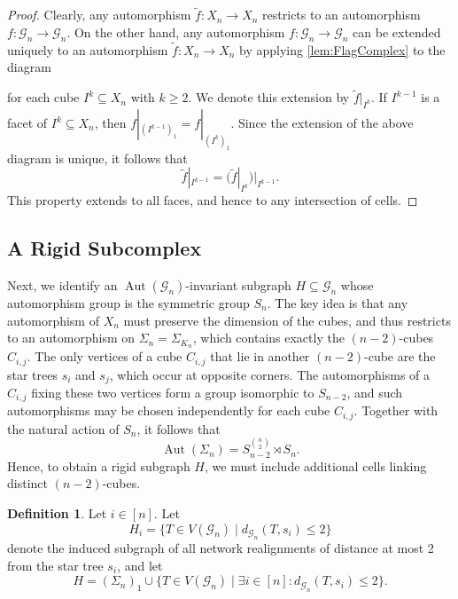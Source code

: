 \documentclass[reqno,dvipsnames]{amsart}
\theoremstyle{plain}
\numberwithin{equation}{section}
\theoremstyle{definition}
\newtheorem{definition}[theorem]{Definition}
\DeclareMathOperator{\Aut}{Aut}
\begin{document}
		\begin{proof}
			Clearly, any automorphism $\tilde{f}:X_n\to X_n$ restricts to an automorphism $f:\mathcal{G}_n\to \mathcal{G}_n$. On the other hand, any automorphism $f: \mathcal{G}_n\to \mathcal{G}_n$ can be extended uniquely to an automorphism $\tilde{f}:X_n\to X_n$ by applying \autoref{lem:FlagComplex} to the diagram 
			\begin{center}
			\end{center}
			for each cube $I^k \subseteq X_n$ with $k\geq 2$. We denote this extension by $\tilde{f}|_{I^k}$. If $I^{k-1}$ is a facet of $I^k\subseteq X_n$, then $f|_{(I^{k-1})_1} = f|_{(I^k)_1}$. Since the extension of the above diagram is unique, it follows that
			\[
				\tilde{f}|_{I^{k-1}} = (\tilde{f}|_{I^k})|_{I^{k-1}}.
			\]
			This property extends to all faces, and hence to any intersection of cells.
		\end{proof}



	\subsection{A Rigid Subcomplex} \label{sec:RigidSubcomplex}

		Next, we identify an $\Aut(\mathcal{G}_n)$-invariant subgraph $H\subseteq \mathcal{G}_n$ whose automorphism group is the symmetric group $S_n$. The key idea is that any automorphism of $X_n$ must preserve the dimension of the cubes, and thus restricts to an automorphism on $\Sigma_n = \Sigma_{K_n}$, which contains exactly the $(n-2)$-cubes $C_{i,j}$. The only vertices of a cube $C_{i,j}$ that lie in another $(n-2)$-cube are the star trees $s_i$ and $s_j$, which occur at opposite corners. The automorphisms of a $C_{i,j}$ fixing these two vertices form a group isomorphic to $S_{n-2}$, and such automorphisms may be chosen independently for each cube $C_{i,j}$. Together with the natural action of $S_n$, it follows that
		\[
			\Aut(\Sigma_n) = S_{n-2}^{\binom{n}{2}} \rtimes S_n.
		\]
		Hence, to obtain a rigid subgraph $H$, we must include additional cells linking distinct $(n-2)$-cubes. 

		\begin{definition}
			Let $i\in [n]$. Let
			\[
				H_i = \{ T\in V(\mathcal{G}_n) \mid d_{\mathcal{G}_n} (T,s_i) \leq 2 \}
			\]
			denote the induced subgraph of all network realignments of distance at most 2 from the star tree $s_i$, and let
			\[
				H = (\Sigma_n)_1 \cup \{ T\in V(\mathcal{G}_n) \mid \exists i\in [n]: d_{\mathcal{G}_n} (T,s_i) \leq 2 \}.
			\]
		\end{definition}
\end{document}
